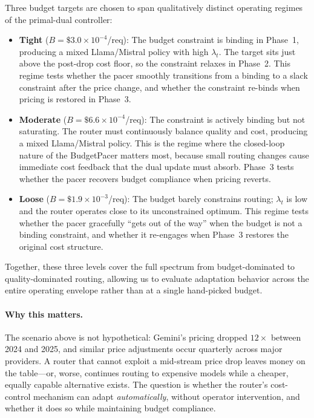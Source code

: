 Three budget targets are chosen to span qualitatively distinct
operating regimes of the primal-dual controller:
\begin{itemize}[nosep,leftmargin=*]
  \item \textbf{Tight} ($B{=}\$3.0{\times}10^{-4}$/req):
    The budget constraint is binding in Phase~1, producing a
    mixed Llama/Mistral policy with high $\lambda_t$.
    The target sits just above the post-drop cost floor,
    so the constraint relaxes in Phase~2.
    This regime tests whether the pacer smoothly transitions
    from a binding to a slack constraint after the price change,
    and whether the constraint re-binds when pricing is restored
    in Phase~3.
  \item \textbf{Moderate} ($B{=}\$6.6{\times}10^{-4}$/req):
    The constraint is actively binding but not saturating.
    The router must continuously balance quality and cost,
    producing a mixed Llama/Mistral policy.  This is the
    regime where the closed-loop nature of the BudgetPacer
    matters most, because small routing changes cause immediate
    cost feedback that the dual update must absorb.
    Phase~3 tests whether the pacer recovers budget compliance
    when pricing reverts.
  \item \textbf{Loose} ($B{=}\$1.9{\times}10^{-3}$/req):
    The budget barely constrains routing; $\lambda_t$ is low
    and the router operates close to its unconstrained optimum.
    This regime tests whether the pacer gracefully ``gets out
    of the way'' when the budget is not a binding constraint,
    and whether it re-engages when Phase~3 restores the
    original cost structure.
\end{itemize}

\noindent
Together, these three levels cover the full spectrum from
budget-dominated to quality-dominated routing, allowing us to
evaluate adaptation behavior across the entire operating envelope
rather than at a single hand-picked budget.

\paragraph{Why this matters.}
The scenario above is not hypothetical: Gemini's pricing dropped
$12\times$ between 2024 and 2025, and similar price adjustments
occur quarterly across major providers.
A router that cannot exploit a mid-stream price drop
leaves money on the table---or, worse, continues routing to
expensive models while a cheaper, equally capable alternative
exists.
The question is whether the router's cost-control mechanism can
adapt \emph{automatically}, without operator intervention, and
whether it does so while maintaining budget compliance.

